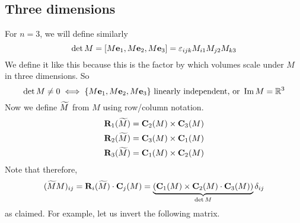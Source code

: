 \subsection{Three dimensions}
For \(n=3\), we will define similarly
\[
	\det M = [M\vb e_1, M\vb e_2, M\vb e_3] = \varepsilon_{ijk}M_{i1}M_{j2}M_{k3}
\]
We define it like this because this is the factor by which volumes scale under \(M\) in three dimensions.
So
\[
	\det M \neq 0 \iff \{ M \vb e_1, M \vb e_2, M \vb e_3 \} \text{ linearly independent, or } \Im M = \mathbb R^3
\]
Now we define \(\widetilde{M}\) from \(M\) using row/column notation.
\begin{align*}
	\vb R_1(\widetilde{M}) & = \vb C_2(M) \times \vb C_3(M) \\
	\vb R_2(\widetilde{M}) & = \vb C_3(M) \times \vb C_1(M) \\
	\vb R_3(\widetilde{M}) & = \vb C_1(M) \times \vb C_2(M)
\end{align*}
Note that therefore,
\[
	(\widetilde{M} M)_{ij} = \vb R_i(\widetilde{M}) \cdot \vb C_j(M) = \underbrace{(\vb C_1(M) \times \vb C_2(M) \cdot \vb C_3(M))}_{\det M}\delta_{ij}
\]
as claimed.
For example, let us invert the following matrix.
